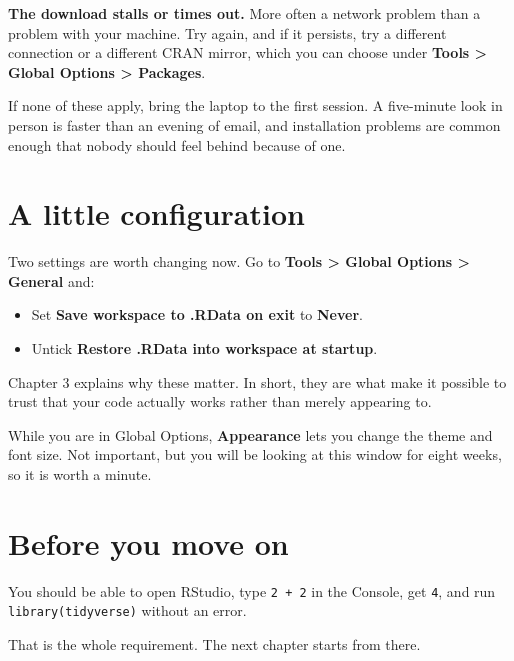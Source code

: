 \documentclass[
  a4paper,
]{scrbook}
\newcounter{none} %
\providecommand{\tightlist}{%
  \setlength{\itemsep}{0pt}\setlength{\parskip}{0pt}}
\begin{document}
\textbf{The download stalls or times out.} More often a network problem
than a problem with your machine. Try again, and if it persists, try a
different connection or a different CRAN mirror, which you can choose
under \textbf{Tools \textgreater{} Global Options \textgreater{}
Packages}.

If none of these apply, bring the laptop to the first session. A
five-minute look in person is faster than an evening of email, and
installation problems are common enough that nobody should feel behind
because of one.

\section*{A little configuration}\label{a-little-configuration}


Two settings are worth changing now. Go to \textbf{Tools \textgreater{}
Global Options \textgreater{} General} and:

\begin{itemize}
\tightlist
\item
  Set \textbf{Save workspace to .RData on exit} to \textbf{Never}.
\item
  Untick \textbf{Restore .RData into workspace at startup}.
\end{itemize}

Chapter 3 explains why these matter. In short, they are what make it
possible to trust that your code actually works rather than merely
appearing to.

While you are in Global Options, \textbf{Appearance} lets you change the
theme and font size. Not important, but you will be looking at this
window for eight weeks, so it is worth a minute.

\section*{Before you move on}\label{before-you-move-on}


You should be able to open RStudio, type \texttt{2\ +\ 2} in the
Console, get \texttt{4}, and run \texttt{library(tidyverse)} without an
error.

That is the whole requirement. The next chapter starts from there.
\end{document}
